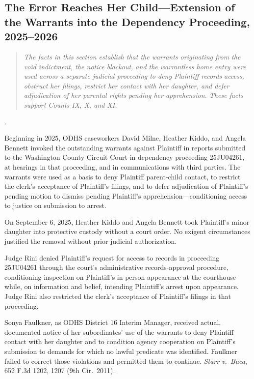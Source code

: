 \documentclass[12pt,letterpaper]{article}
\newcounter{complaintpara}
\newenvironment{paras}{%
	\begin{list}{\arabic{complaintpara}.}{%
			\setlength{\leftmargin}{0.5in}%
			\setlength{\labelwidth}{0.4in}%
			\setlength{\labelsep}{0.1in}%
			\setlength{\itemsep}{0pt}%
			\setlength{\parsep}{0pt}%
			\setlength{\topsep}{6pt}%
		}%
	}{%
	\end{list}%
}
\begin{document}
	\subsection*{The Error Reaches Her Child---Extension of the Warrants into the Dependency Proceeding, 2025--2026}
	\begin{quote}
		\textit{The facts in this section establish that the warrants
			originating from the void indictment, the notice blackout, and
			the warrantless home entry were used across a separate judicial
			proceeding to deny Plaintiff records access, obstruct her
			filings, restrict her contact with her daughter, and defer
			adjudication of her parental rights pending her apprehension.
			These facts support Counts IX, X, and XI.}
	\end{quote}
	\begin{paras}
		
		\item\label{fact:dependency} Beginning in 2025, ODHS caseworkers
		David Milne, Heather Kiddo, and Angela Bennett invoked the
		outstanding warrants against Plaintiff in reports submitted to
		the Washington County Circuit Court in dependency proceeding
		25JU04261, at hearings in that proceeding, and in
		communications with third parties. The warrants were used as
		a basis to deny Plaintiff parent-child contact, to restrict
		the clerk's acceptance of Plaintiff's filings, and to defer
		adjudication of Plaintiff's pending motion to dismiss pending
		Plaintiff's apprehension---conditioning access to justice on
		submission to arrest.
		
		\item\label{fact:removal} On September 6, 2025, Heather Kiddo and
		Angela Bennett took Plaintiff's minor daughter into protective
		custody without a court order. No exigent circumstances
		justified the removal without prior judicial authorization.
		
		\item\label{fact:rini} Judge Rini denied Plaintiff's request for
		access to records in proceeding 25JU04261 through the court's
		administrative records-approval procedure, conditioning
		inspection on Plaintiff's in-person appearance at the
		courthouse while, on information and belief, intending
		Plaintiff's arrest upon appearance. Judge Rini also restricted
		the clerk's acceptance of Plaintiff's filings in that
		proceeding.
		
		\item\label{fact:faulkner} Sonya Faulkner, as ODHS District 16
		Interim Manager, received actual, documented notice of her
		subordinates' use of the warrants to deny Plaintiff contact
		with her daughter and to condition agency cooperation on
		Plaintiff's submission to demands for which no lawful
		predicate was identified. Faulkner failed to correct those
		violations and permitted them to continue.
		\textit{Starr v.\ Baca}, 652 F.3d 1202, 1207
		(9th Cir.\ 2011).
		
	\end{paras}
\end{document}
